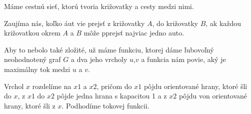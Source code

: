 
Máme cestnú sieť, ktorú tvoria križovatky a cesty medzi nimi. 

Zaujíma nás, koľko áut vie prejsť z
križovatky $A$, do križovatky $B$, ak každou križovatkou okrem $A$ a $B$ môže pprejsť najviac jedno auto.

Aby to nebolo také zložité, už máme funkciu, ktorej dáme ľubovoľný neohodnotený graf $G$ a dva jeho vrcholy
$u$,$v$ a funkcia nám povie, aký je maximálny tok medzi $u$ a $v$. 

Vrchol $x$ rozdelíme na $x1$ a $x2$, pričom do $x1$ pôjdu orientované hrany, ktoré šli do $x$, z $x1$
do $x2$ pôjde jedna hrana s kapacitou 1 a z $x2$ pôjdu von orientované hrany, ktoré šli z $x$.
Podhodíme tokovej funkcii.

